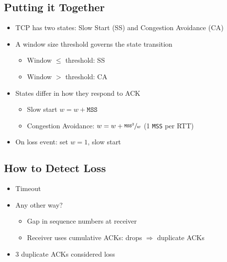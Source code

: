 \subsection{Putting it Together}
\begin{itemize}[nosep]
    \item TCP has two states: Slow Start (SS) and Congestion Avoidance (CA)
    \item A window size threshold governs the state transition
          \begin{itemize}[nosep]
              \item Window $\leq$ threshold: SS
              \item Window $>$ threshold: CA
          \end{itemize}
    \item States differ in how they respond to ACK
          \begin{itemize}[nosep]
              \item Slow start $w = w + \texttt{MSS}$
              \item Congestion Avoidance: $w = w + \sfrac{\texttt{MSS}^2}{w}$ (1 \texttt{MSS} per RTT)
          \end{itemize}
    \item On loss event: set $w = 1$, slow start
\end{itemize}

\subsection{How to Detect Loss}
\begin{itemize}[nosep]
    \item Timeout
    \item Any other way?
          \begin{itemize}[nosep]
              \item Gap in sequence numbers at receiver
              \item Receiver uses cumulative ACKs: drops $\Rightarrow$ duplicate ACKs
          \end{itemize}
    \item 3 duplicate ACKs considered loss
\end{itemize}

